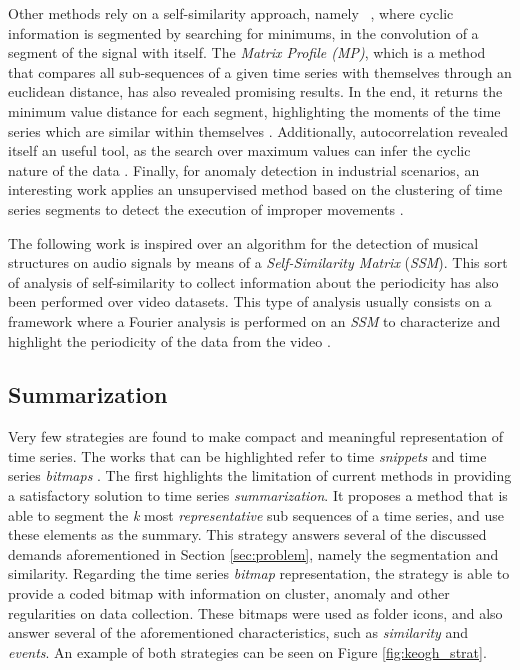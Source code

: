 \par
Other methods rely on a self-similarity approach, namely ~\cite{neuza}, where cyclic information is segmented by searching for minimums, in the convolution of a segment of the signal with itself. The \textit{Matrix Profile (MP)}, which is a method that compares all sub-sequences of a given time series with themselves through an euclidean distance, has also revealed promising results. In the end, it returns the minimum value distance for each segment, highlighting the moments of the time series which are similar within themselves \cite{Yeh2018}. Additionally, autocorrelation revealed itself an useful tool, as the search over maximum values can infer the cyclic nature of the data \cite{Bauters2014}. Finally, for anomaly detection in industrial scenarios, an interesting work applies an unsupervised method based on the clustering of time series segments to detect the execution of improper movements \cite{duarte2}. 
\par
The following work is inspired over an algorithm for the detection of musical structures on audio signals \cite{Foote2000, audiolabs1, audiolabs2} by means of a \textit{Self-Similarity Matrix } (\textit{SSM}). This sort of analysis of self-similarity to collect information about the periodicity has also been performed over video datasets. This type of analysis usually consists on a framework where a Fourier analysis is performed on an \textit{SSM} to characterize and highlight the periodicity of the data from the video \cite{Cutler2002,Cutler2000,Cutler1999}.


\subsection{Summarization}

Very few strategies are found to make compact and meaningful representation of time series. The works that can be highlighted refer to time \textit{snippets} and time series \textit{bitmaps} \cite{snippets, bitmap}. The first highlights the limitation of current methods in providing a satisfactory solution to time series \textit{summarization}. It proposes a method that is able to segment the \textit{k} most \textit{representative} sub sequences of a time series, and use these elements as the summary. This strategy answers several of the discussed demands aforementioned in Section \ref{sec:problem}, namely the segmentation and similarity. Regarding the time series \textit{bitmap} representation, the strategy is able to provide a coded bitmap with information on cluster, anomaly and other regularities on data collection. These bitmaps were used as folder icons, and also answer several of the aforementioned characteristics, such as \textit{similarity} and \textit{events}. An example of both strategies can be seen on Figure \ref{fig:keogh_strat}.

